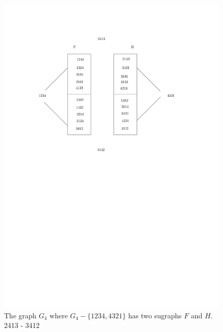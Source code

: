 \documentclass[runningheads]{llncs}
\begin{document}
\begin{figure}[ht]
  \centering
  \includegraphics{f1_v2.pdf}
  \caption{The graph $G_{4}$ where $G_{4}-\{1234,4321\}$ has two sugraphs $F$ and $H$.
  2413 - 3412}
  \label{f1}
\end{figure}
\end{document}
